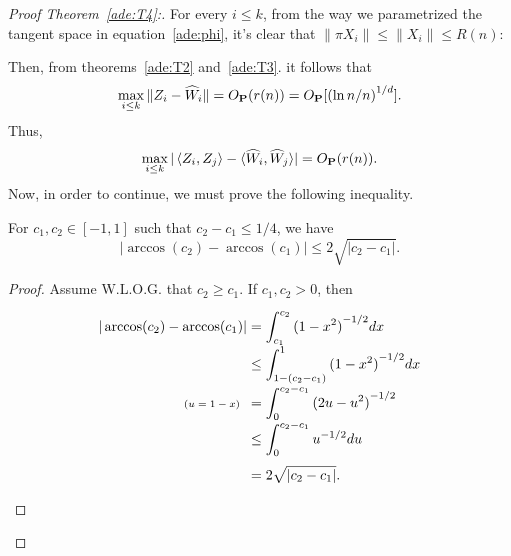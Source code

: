 \begin{proof}[Proof Theorem~\ref{ade:T4}:]\label{ade:T4P} 
For every $ i\leq k$, from the way we parametrized the tangent space in equation~\ref{ade:phi}, it's clear that $\|\pi X_i\| \leq \|X_i\| \leq R(n)$:

\vspace*{1em}

  \begin{center}
\end{center}

  \vspace*{1em}

  Then, from theorems~\ref{ade:T2} and~\ref{ade:T3}. it follows that
  \[ \max_{i \leq k} \|Z_i - \widehat{W}_i\| = O_\P (r(n)) = O_\P [{(\ln n / n)}^{1/d}].\] 
  Thus,
  \[ \max_{i \leq k} |\angles{Z_i,Z_j} - \langle\widehat{W}_i, \widehat{W}_j\rangle| = O_\P (r(n)). \]
  Now, in order to continue, we must prove the following inequality.
  \begin{lemma}
    For $c_1, c_2 \in [-1, 1]$ such that $c_2-c_1 \leq 1/4$, we have
    \[ |\arccos(c_2) - \arccos(c_1)| \leq 2 \sqrt{|c_2 - c_1|}. \] 
  \end{lemma}

  \begin{proof}
    Assume W.L.O.G. that $c_2 \geq c_1$. If $c_1,c_2 > 0$, then
    \[ \everymath{\displaystyle}\arraycolsep=1.4pt\def\arraystretch{2}
    \begin{array}{rcl}
      |\arccos(c_2) - \arccos(c_1)| & = & \int_{c_1}^{c_2} {(1-x^2)}^{-1/2}dx\\
      & \leq & \int_{1-(c_2-c_1)}^{1} {(1-x^2)}^{-1/2}dx\\
      \text{\scriptsize ($ u = 1-x $)}\hspace*{0.5em} & = & \int_0^{c_2-c_1} {(2u-u^2)}^{-1/2}\\
      & \leq & \int_0^{c_2-c_1} u^{-1/2} du\\
      & = & 2 \sqrt{|c_2 - c_1|}.
    \end{array}
    \]


\end{proof}
\end{proof}
